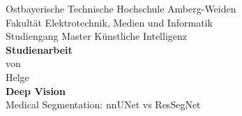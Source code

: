 \documentclass[12pt,oneside]{report}
\newcommand*{\Sperren}[1]{\textls*[100]{#1}}
\newcommand*{\IhrVorname}{Helge}
\newcommand*{\IhrNachname}{Kohl}
\newcommand*{\IhrStudiengang}{Master Künstliche Intelligenz}
\newcommand*{\IhreArbeit}{Studienarbeit}
\newcommand*{\IhrTitelDE}{Deep Vision}
\newcommand*{\IhrTitelEN}{
Medical Segmentation: nnUNet vs ResSegNet
}
\begin{document}
  \begin{titlepage}					%
    \thispagestyle{empty}
    \begin{center}
      \Large
      Ostbayerische Technische Hochschule Amberg-Weiden\\
      Fakultät Elektrotechnik, Medien und Informatik\\[1cm]
      Studiengang \IhrStudiengang\\[1cm]
      
      \textbf{\IhreArbeit}\\[1cm]
      von\\[1cm]
      \IhrVorname\ \Sperren{\textbf{\IhrNachname}}\\[1cm]
      \textbf{\IhrTitelDE}\\[1cm]
      \IhrTitelEN
    \end{center}
  \end{titlepage}
  \tableofcontents
  \newpage
  \listoffigures
  \newpage
  
  
  
  
  
 
    \printbibliography
  \newpage
  
\end{document}
